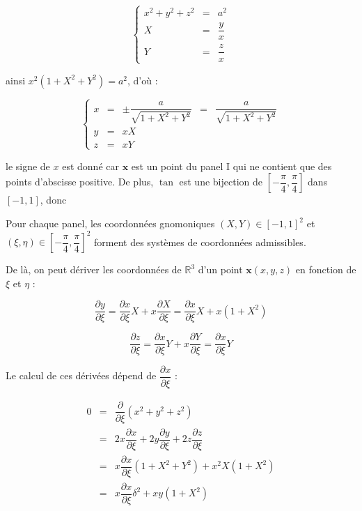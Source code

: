 \begin{equation}
\left\lbrace
\begin{array}{rcl}
x^2+y^2+z^2 & = & a^2\\
X & = & \dfrac{y}{x} \\
Y & = & \dfrac{z}{x}
\end{array}
\right.
\end{equation}

ainsi $x^2 \left( 1+X^2+Y^2 \right) = a^2$, d'où :

\begin{equation}
\left\lbrace
\begin{array}{rclcl}
x & = & \pm \dfrac{a}{\sqrt{1+X^2+Y^2}}& = & \dfrac{a}{\sqrt{1+X^2+Y^2}}\\
y & = & xX &&\\
z & = & xY &&
\end{array}
\right.
\end{equation}

le signe de $x$ est donné car $\mathbf{x}$ est un point du panel I qui ne contient que des points d'abscisse positive.
De plus, $\tan$ est une bijection de $\left[ -\dfrac{\pi}{4}, \dfrac{\pi}{4} \right]$ dans $\left[-1,1\right]$, donc

\begin{theoreme}
Pour chaque panel, les coordonnées gnomoniques $(X,Y) \in [-1,1]^2$ et $(\xi, \eta) \in \left[ - \dfrac{\pi}{4}, \dfrac{\pi}{4} \right]^2$ forment des systèmes de coordonnées admissibles.
\end{theoreme}

De là, on peut dériver les coordonnées de $\mathbb{R}^3$ d'un point $\mathbf{x}(x,y,z)$ en fonction de $\xi$ et $\eta$ :

\begin{equation}
\dfrac{\partial y}{\partial \xi} = \dfrac{\partial x}{\partial \xi} X + x \dfrac{\partial X}{\partial \xi} = \dfrac{\partial x}{\partial \xi} X + x(1+X^2)
\end{equation}

\begin{equation}
\dfrac{\partial z}{\partial \xi} = \dfrac{\partial x}{\partial \xi} Y + x \dfrac{\partial Y}{\partial \xi} = \dfrac{\partial x}{\partial \xi} Y
\end{equation}

Le calcul de ces dérivées dépend de $\dfrac{\partial x}{\partial \xi}$ :

\begin{equation*}
\begin{array}{rcl}
0 & = & \dfrac{\partial}{\partial \xi} ( x^2+y^2+z^2) \\
  & = & 2x\dfrac{\partial x}{\partial \xi} + 2y\dfrac{\partial y}{\partial \xi}+ 2z\dfrac{\partial z}{\partial \xi} \\
  & = & x \dfrac{\partial x}{\partial \xi} ( 1 +X^2 + Y^2) + x^2 X (1+X^2)\\
  & = & x \dfrac{\partial x}{\partial \xi} \delta^2 + xy (1+X^2)
\end{array}
\end{equation*}

